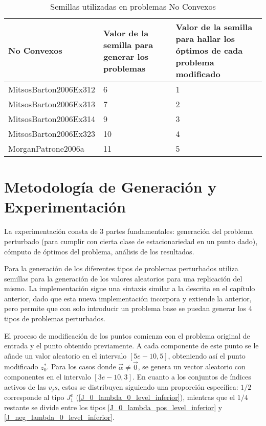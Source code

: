     \begin{table}[h!]
        \centering
        \caption{Semillas utilizadas en problemas No Convexos}
        \begin{adjustbox}{max width=\textwidth}
        \begin{tabular}{ | m{5cm} | m{5cm} | m{5cm} | }
          
          \hline
          \textbf{No Convexos} & \textbf{Valor de la semilla para generar los problemas}  & \textbf{Valor de la semilla para hallar los óptimos de cada problema modificado} \\
          \hline
          MitsosBarton2006Ex312 & 6  & 1\\
          \hline
          MitsosBarton2006Ex313 & 7 & 2 \\
          \hline
          MitsosBarton2006Ex314 & 9 & 3\\
          \hline
          MitsosBarton2006Ex323 & 10 & 4\\
          \hline
          MorganPatrone2006a & 11 & 5 \\
          \hline
        \end{tabular}
     \end{adjustbox}
    \end{table}

    \section{Metodología de Generación y Experimentación}
    La experimentación consta de 3 partes fundamentales: generación del problema perturbado (para cumplir con cierta clase de estacionariedad en un punto dado), cómputo de óptimos del problema, análisis de los resultados.

    Para la generación de los diferentes tipos de problemas perturbados utiliza semillas para la generación de los valores aleatorios para una replicación del mismo.
    La implementación sigue una sintaxis similar a la descrita en el capítulo anterior, dado que esta nueva implementación incorpora y extiende la anterior, pero permite 
    que con solo introducir un problema base se puedan generar los 4 tipos de problemas perturbados.
    
    El proceso de modificación de los puntos comienza con el problema original de entrada y el punto obtenido previamente. A cada componente de este punto se le añade un valor aleatorio en el intervalo $[5e-10, 5]$, obteniendo así el punto modificado $z^*_0$. Para los casos donde $\vec{\alpha}\neq \vec{0}$, se genera un vector aleatorio con componentes en el intervalo $[3e-10, 3]$. En cuanto a los conjuntos de índices activos de las $v_{j}s$, estos se distribuyen siguiendo una proporción específica: $1/2$ corresponde al tipo $J_1^v$ (\ref{J_0_lambda_0_level_inferior}), mientras que el $1/4$ restante se divide entre los tipos \ref{J_0_lambda_pos_level_inferior} y \ref{J_neg_lambda_0_level_inferior}.
    
